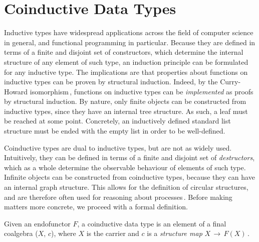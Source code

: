 \section{Coinductive Data Types}
\label{sec:coinductive-types}
\newcommand{\bisim}{\text{\texttildelow}}

Inductive types have widespread applications across the field of computer
science in general, and functional programming in particular. Because they are
defined in terms of a finite and disjoint set of constructors, which determine
the internal structure of any element of such type, an induction
principle can be formulated for any inductive type. The implications are that
properties about functions on inductive types can be proven by structural
induction. Indeed, by the Curry-Howard
isomorphism\,\citep{Curry1934,Howard80,Wadler2014}, functions on inductive types
can be \emph{implemented} as proofs by structural induction. By nature, only
finite objects can be constructed from inductive types, since they have an
internal tree structure. As such, a leaf must be reached at some
point. Concretely, an inductively defined standard list structure must be ended
with the empty list in order to be well-defined.

Coinductive types are dual to inductive types, but are not as widely
used. Intuitively, they can be defined in terms of a finite and disjoint set of
\emph{destructors}, which as a whole determine the observable behaviour of
elements of such type. Infinite objects can be constructed from coinductive
types, because they can have an internal graph structure. This allows for the
definition of circular structures, and are therefore often used for reasoning
about processes\,\citep{Sangiorgi2011}. Before making matters more concrete, we
proceed with a formal definition.

\begin{definition}
\label{def:coinductive_data_type}
  Given an endofunctor $F$, a coinductive data type is an element of a final
  coalgebra ($X$, $c$), where $X$ is the carrier and $c$ is a \emph{structure
    map} $X\,\to\,F(X)$\,\citep{Jacobs97atutorial,Kozen2012}.
\end{definition}

